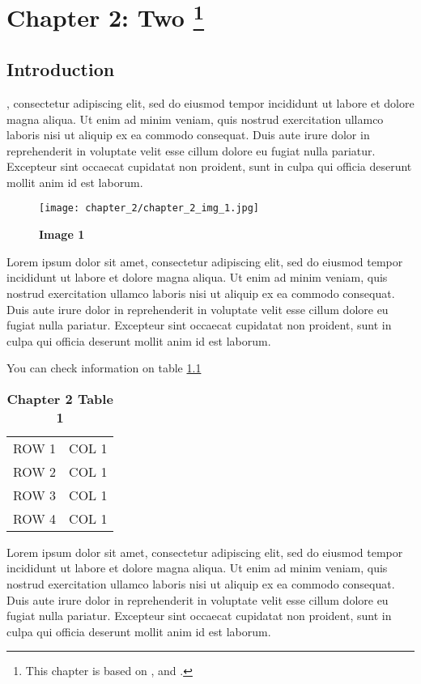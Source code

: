 \chapter[Chapter 2: Two]{Chapter 2: Two \footnote{This chapter is based on \cite{einstein}, \cite{latexcompanion} and \cite{knuthwebsite}.}}
\label{chap:chapter_2} 

\section{Introduction}

, consectetur adipiscing elit, sed do eiusmod tempor incididunt ut labore et dolore magna aliqua. Ut enim ad minim veniam, quis nostrud exercitation ullamco laboris nisi ut aliquip ex ea commodo consequat. Duis aute irure dolor in reprehenderit in voluptate velit esse cillum dolore eu fugiat nulla pariatur. Excepteur sint occaecat cupidatat non proident, sunt in culpa qui officia deserunt mollit anim id est laborum.
\begin{figure}[thpb]
    \centering
    \texttt{[image: chapter\_2/chapter\_2\_img\_1.jpg]}
    \caption[Image 1]{\bf{Image 1}}
    \label{fig:chapt_1_img_1}
\end{figure}

Lorem ipsum dolor sit amet, consectetur adipiscing elit, sed do eiusmod tempor incididunt ut labore et dolore magna aliqua. Ut enim ad minim veniam, quis nostrud exercitation ullamco laboris nisi ut aliquip ex ea commodo consequat. Duis aute irure dolor in reprehenderit in voluptate velit esse cillum dolore eu fugiat nulla pariatur. Excepteur sint occaecat cupidatat non proident, sunt in culpa qui officia deserunt mollit anim id est laborum.\newline

You can check information on table \ref{tab:chaper_2_table_1} 

\begin{table}[thpb]
\begin{center}
\begin{tabular}{l l}
ROW 1&COL 1\\
ROW 2&COL 1\\
ROW 3&COL 1\\
ROW 4&COL 1\\
\end{tabular}
\caption[Chapter 2 Table 1]{\bf{Chapter 2 Table 1}}
\label{tab:chaper_2_table_1}
\end{center}
\end{table}

Lorem ipsum dolor sit amet, consectetur adipiscing elit, sed do eiusmod tempor incididunt ut labore et dolore magna aliqua. Ut enim ad minim veniam, quis nostrud exercitation ullamco laboris nisi ut aliquip ex ea commodo consequat. Duis aute irure dolor in reprehenderit in voluptate velit esse cillum dolore eu fugiat nulla pariatur. Excepteur sint occaecat cupidatat non proident, sunt in culpa qui officia deserunt mollit anim id est laborum.

